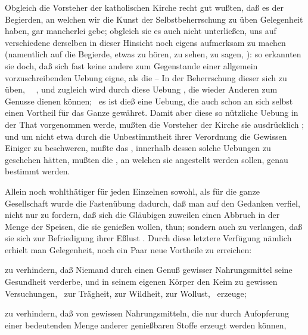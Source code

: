 \begin{aufza}
\item Obgleich die Vorsteher der katholischen Kirche recht gut wußten, daß es der Begierden, an welchen wir die Kunst der Selbstbeherrschung zu üben Gelegenheit haben, gar mancherlei gebe; obgleich sie es auch nicht unterließen, uns auf verschiedene derselben in dieser Hinsicht noch eigens aufmerksam zu machen (namentlich auf die Begierde, etwas zu hören, zu sehen, zu sagen, \usw ): so erkannten sie doch, daß sich fast keine andere zum Gegenstande einer allgemein vorzuschreibenden Uebung eigne, als die --  In der Beherrschung dieser sich zu üben, ~\ , und zugleich wird durch diese Uebung , die wieder Anderen zum Genusse dienen können; \dh\ es ist dieß eine Uebung, die auch schon an sich selbst einen Vortheil für das Ganze gewähret. Damit aber diese so nützliche Uebung in der That vorgenommen werde, mußten die Vorsteher der Kirche sie ausdrücklich ; und um nicht etwa durch die Unbestimmtheit ihrer Verordnung die Gewissen Einiger zu beschweren, mußte das , innerhalb dessen solche Uebungen zu geschehen hätten, mußten die , an welchen sie angestellt werden sollen, genau bestimmt werden.
\item Allein noch wohlthätiger für jeden Einzelnen sowohl, als für die ganze Gesellschaft wurde die Fastenübung dadurch, daß man auf den Gedanken verfiel, nicht nur zu fordern, daß sich die Gläubigen zuweilen einen Abbruch in der Menge der Speisen, die sie genießen wollen, thun; sondern auch zu verlangen, daß sie sich zur Befriedigung ihrer Eßlust . Durch diese letztere Verfügung nämlich erhielt man Gelegenheit, noch ein Paar neue Vortheile zu erreichen:
\begin{aufzb}
\item zu verhindern, daß Niemand durch einen  Genuß gewisser Nahrungsmittel seine Gesundheit verderbe, und in seinem eigenen Körper den Keim zu gewissen Versuchungen, \zB\  zur Trägheit, zur Wildheit, zur Wollust, \udgl\  erzeuge;
\item zu verhindern, daß von gewissen Nahrungsmitteln, die nur durch Aufopferung einer bedeutenden Menge anderer genießbaren Stoffe erzeugt werden können, 
\end{aufzb}

\end{aufza}
